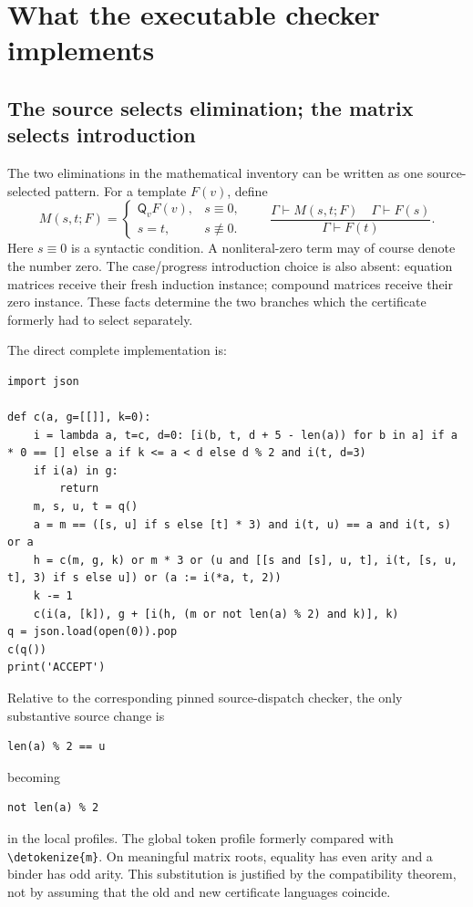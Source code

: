 \documentclass[11pt,letterpaper]{article}
\theoremstyle{definition}\newtheorem{definition}[theorem]{Definition}
\theoremstyle{remark}\newtheorem{remark}[theorem]{Remark}
\newcommand{\Q}{\mathsf Q}
\newcommand{\file}[1]{\expandafter\nolinkurl\expandafter{\detokenize{#1}}}
\begin{document}


\section{What the executable checker implements}
\label{sec:implementation}

\subsection{The source selects elimination; the matrix selects introduction}

The two eliminations in the mathematical inventory can be written as one
source-selected pattern. For a template $F(v)$, define
\[
M(s,t;F)=
\begin{cases}
\Q_vF(v),&s\equiv0,\\
s=t,&s\not\equiv0.
\end{cases}
\qquad
\frac{\Gamma\vdash M(s,t;F)\quad\Gamma\vdash F(s)}
     {\Gamma\vdash F(t)}.
\]
Here $s\equiv0$ is a syntactic condition. A nonliteral-zero term may of
course denote the number zero. The case/progress introduction choice is
also absent: equation matrices receive their fresh induction instance;
compound matrices receive their zero instance. These facts determine the
two branches which the certificate formerly had to select separately.

The direct complete implementation is:
\begin{lstlisting}
import json

def c(a, g=[[]], k=0):
    i = lambda a, t=c, d=0: [i(b, t, d + 5 - len(a)) for b in a] if a * 0 == [] else a if k <= a < d else d % 2 and i(t, d=3)
    if i(a) in g:
        return
    m, s, u, t = q()
    a = m == ([s, u] if s else [t] * 3) and i(t, u) == a and i(t, s) or a
    h = c(m, g, k) or m * 3 or (u and [[s and [s], u, t], i(t, [s, u, t], 3) if s else u]) or (a := i(*a, t, 2))
    k -= 1
    c(i(a, [k]), g + [i(h, (m or not len(a) % 2) and k)], k)
q = json.load(open(0)).pop
c(q())
print('ACCEPT')
\end{lstlisting}

Relative to the corresponding pinned source-dispatch checker, the only
substantive source change is
\begin{lstlisting}
len(a) % 2 == u
\end{lstlisting}
becoming
\begin{lstlisting}
not len(a) % 2
\end{lstlisting}
in the local profiles. The global token profile formerly compared with
\file{m}. On meaningful matrix roots, equality has even arity and a binder
has odd arity. This substitution is justified by the compatibility theorem,
not by assuming that the old and new certificate languages coincide.
\end{document}
